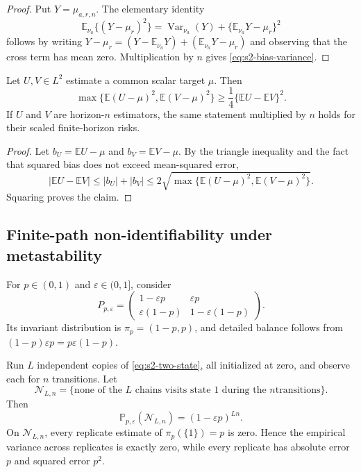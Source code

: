 \begin{proof}
Put \(Y=\widehat\mu_{a,r,n}\).  The elementary identity
\[
 \mathbb E_{\nu_a}\{(Y-\mu_r)^2\}
 =
 \operatorname{Var}_{\nu_a}(Y)
 +
 \{\mathbb E_{\nu_a}Y-\mu_r\}^2
\]
follows by writing \(Y-\mu_r=(Y-\mathbb E_{\nu_a}Y)
+(\mathbb E_{\nu_a}Y-\mu_r)\) and observing that the cross term has mean zero.
Multiplication by \(n\) gives \eqref{eq:s2-bias-variance}.
\end{proof}

\begin{proposition}
\label{prop:s2-disagreement}
Let \(U,V\in L^2\) estimate a common scalar target \(\mu\).  Then
\begin{equation}
 \max\{\mathbb E(U-\mu)^2,\mathbb E(V-\mu)^2\}
 \geq
 \frac14\{\mathbb E U-\mathbb E V\}^2.
 \label{eq:s2-disagreement}
\end{equation}
If \(U\) and \(V\) are horizon-\(n\) estimators, the same statement multiplied
by \(n\) holds for their scaled finite-horizon risks.
\end{proposition}

\begin{proof}
Let \(b_U=\mathbb E U-\mu\) and \(b_V=\mathbb E V-\mu\).  By the triangle
inequality and the fact that squared bias does not exceed mean-squared error,
\[
 |\mathbb E U-\mathbb E V|
 \leq |b_U|+|b_V|
 \leq
 2\sqrt{\max\{\mathbb E(U-\mu)^2,\mathbb E(V-\mu)^2\}}.
\]
Squaring proves the claim.
\end{proof}

\subsection{Finite-path non-identifiability under metastability}
\label{subsec:stage2-nonidentifiability}

For \(p\in(0,1)\) and \(\varepsilon\in(0,1]\), consider
\begin{equation}
 P_{p,\varepsilon}
 =
 \begin{pmatrix}
  1-\varepsilon p & \varepsilon p\\
  \varepsilon(1-p) & 1-\varepsilon(1-p)
 \end{pmatrix}.
 \label{eq:s2-two-state}
\end{equation}
Its invariant distribution is
\(\pi_p=(1-p,p)\), and detailed balance follows from
\((1-p)\varepsilon p=p\varepsilon(1-p)\).

\begin{theorem}
\label{thm:s2-false-precision}
Run \(L\) independent copies of \eqref{eq:s2-two-state}, all initialized at
zero, and observe each for \(n\) transitions.  Let
\[
 \mathcal N_{L,n}
 =
 \{\text{none of the \(L\) chains visits state \(1\) during the \(n\)
 transitions}\}.
\]
Then
\begin{equation}
 \mathbb P_{p,\varepsilon}(\mathcal N_{L,n})
 =
 (1-\varepsilon p)^{Ln}.
 \label{eq:s2-no-visit}
\end{equation}
On \(\mathcal N_{L,n}\), every replicate estimate of
\(\pi_p(\{1\})=p\) is zero.  Hence the empirical variance across replicates is
exactly zero, while every replicate has absolute error \(p\) and squared error
\(p^2\).
\end{theorem}

